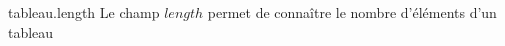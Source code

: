 \begin{frame}{tableau.length}
    Le champ $length$ permet de connaître le nombre d'éléments d'un tableau
    
\end{frame}
